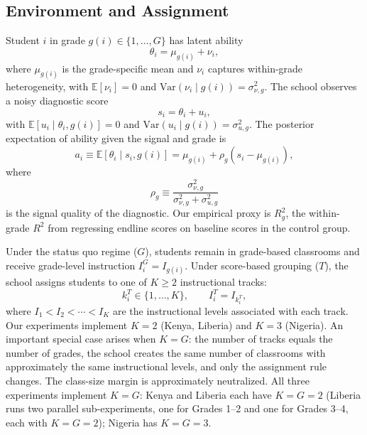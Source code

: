 \documentclass[11pt]{article}
\newcommand{\E}{\mathbb{E}}
\begin{document}
\subsection{Environment and Assignment}

Student $i$ in grade $g(i) \in \{1, \ldots, G\}$ has latent ability
\begin{equation}
\label{eq:ability}
\theta_i = \mu_{g(i)} + \nu_i,
\end{equation}
where $\mu_{g(i)}$ is the grade-specific mean and $\nu_i$ captures within-grade heterogeneity, with $\E[\nu_i] = 0$ and $\text{Var}(\nu_i \mid g(i)) = \sigma^2_{\nu,g}$. The school observes a noisy diagnostic score
\begin{equation}
\label{eq:score}
s_i = \theta_i + u_i,
\end{equation}
with $\E[u_i \mid \theta_i, g(i)] = 0$ and $\text{Var}(u_i \mid g(i)) = \sigma^2_{u,g}$. The posterior expectation of ability given the signal and grade is
\begin{equation}
\label{eq:posterior}
a_i \equiv \E[\theta_i \mid s_i, g(i)] = \mu_{g(i)} + \rho_g(s_i - \mu_{g(i)}),
\end{equation}
where
\begin{equation}
\label{eq:signal_quality}
\rho_g \equiv \frac{\sigma^2_{\nu,g}}{\sigma^2_{\nu,g} + \sigma^2_{u,g}}
\end{equation}
is the signal quality of the diagnostic. Our empirical proxy is $R^2_g$, the within-grade $R^2$ from regressing endline scores on baseline scores in the control group.

Under the status quo regime ($G$), students remain in grade-based classrooms and receive grade-level instruction $I_i^G = I_{g(i)}$. Under score-based grouping ($T$), the school assigns students to one of $K \geq 2$ instructional tracks:
\begin{equation}
k_i^T \in \{1, \ldots, K\}, \qquad I_i^T = I_{k_i^T},
\end{equation}
where $I_1 < I_2 < \cdots < I_K$ are the instructional levels associated with each track. Our experiments implement $K = 2$ (Kenya, Liberia) and $K = 3$ (Nigeria). An important special case arises when $K = G$: the number of tracks equals the number of grades, the school creates the same number of classrooms with approximately the same instructional levels, and only the assignment rule changes. The class-size margin is approximately neutralized. All three experiments implement $K = G$: Kenya and Liberia each have $K = G = 2$ (Liberia runs two parallel sub-experiments, one for Grades 1--2 and one for Grades 3--4, each with $K = G = 2$); Nigeria has $K = G = 3$.
\end{document}
